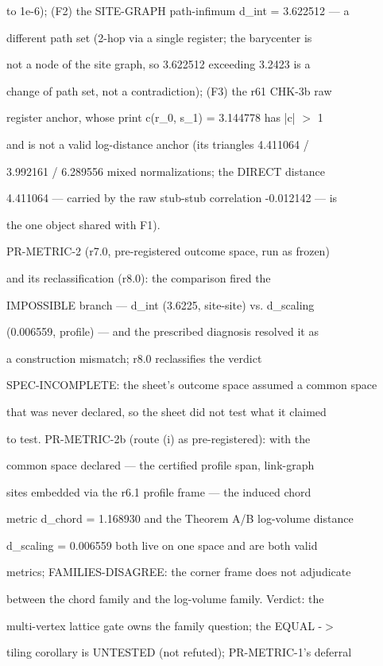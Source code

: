 \documentclass[11pt,a4paper]{article}
\theoremstyle{definition}
\begin{document}
to 1e-6); (F2) the SITE-GRAPH path-infimum d\_int = 3.622512 — a

different path set (2-hop via a single register; the barycenter is

not a node of the site graph, so 3.622512 exceeding 3.2423 is a

change of path set, not a contradiction); (F3) the r61 CHK-3b raw

register anchor, whose print c(r\_0, s\_1) = 3.144778 has |c| $>$ 1

and is not a valid log-distance anchor (its triangles 4.411064 /

3.992161 / 6.289556 mixed normalizations; the DIRECT distance

4.411064 — carried by the raw stub-stub correlation -0.012142 — is

the one object shared with F1).


PR-METRIC-2 (r7.0, pre-registered outcome space, run as frozen)

and its reclassification (r8.0): the comparison fired the

IMPOSSIBLE branch — d\_int (3.6225, site-site) vs. d\_scaling

(0.006559, profile) — and the prescribed diagnosis resolved it as

a construction mismatch; r8.0 reclassifies the verdict

SPEC-INCOMPLETE: the sheet's outcome space assumed a common space

that was never declared, so the sheet did not test what it claimed

to test. PR-METRIC-2b (route (i) as pre-registered): with the

common space declared — the certified profile span, link-graph

sites embedded via the r6.1 profile frame — the induced chord

metric d\_chord = 1.168930 and the Theorem A/B log-volume distance

d\_scaling = 0.006559 both live on one space and are both valid

metrics; FAMILIES-DISAGREE: the corner frame does not adjudicate

between the chord family and the log-volume family. Verdict: the

multi-vertex lattice gate owns the family question; the EQUAL -$>$

tiling corollary is UNTESTED (not refuted); PR-METRIC-1's deferral
\end{document}
